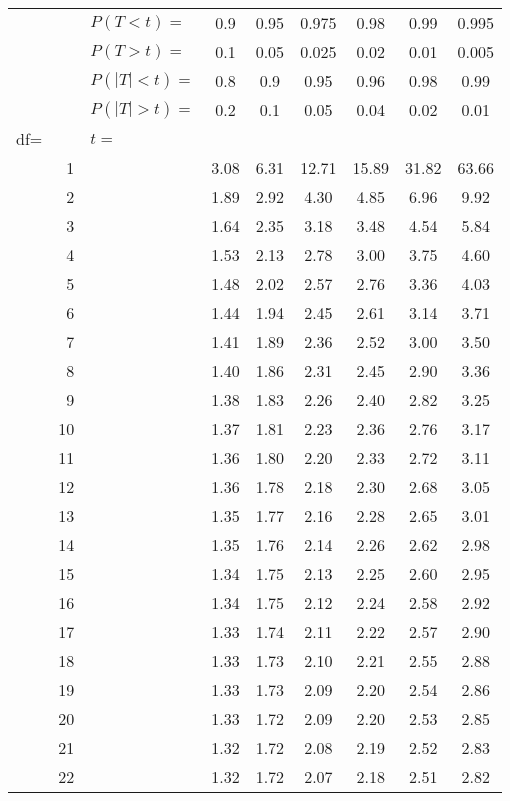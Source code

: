 \documentclass[12pt,letterpaper]{article}
\author{Chad Worley}
\begin{document}

\begin{center}
\renewcommand{\arraystretch}{1.0}
\begin{tabular}{|l r | l c c c c c c|}\hline
&& $P(T<t)=$ & 0.9 & 0.95 & 0.975 & 0.98 & 0.99 & 0.995\\
&& $P(T>t)=$ & 0.1 & 0.05 & 0.025 & 0.02 & 0.01 & 0.005\\
&& $P(|T|<t)=$ & 0.8 & 0.9 & 0.95 & 0.96 & 0.98 & 0.99\\
&& $P(|T|>t)=$ & 0.2 & 0.1 & 0.05 & 0.04 & 0.02 & 0.01\\\hline
df= && $t=$ & & & & & &\\ 
&1&& 3.08 & 6.31 & 12.71 & 15.89 & 31.82 & 63.66\\ 
&2&& 1.89 & 2.92 & 4.30 & 4.85 & 6.96 & 9.92\\ 
&3&& 1.64 & 2.35 & 3.18 & 3.48 & 4.54 & 5.84\\ 
&4&& 1.53 & 2.13 & 2.78 & 3.00 & 3.75 & 4.60\\ 
&5&& 1.48 & 2.02 & 2.57 & 2.76 & 3.36 & 4.03\\ 
&6&& 1.44 & 1.94 & 2.45 & 2.61 & 3.14 & 3.71\\ 
&7&& 1.41 & 1.89 & 2.36 & 2.52 & 3.00 & 3.50\\ 
&8&& 1.40 & 1.86 & 2.31 & 2.45 & 2.90 & 3.36\\ 
&9&& 1.38 & 1.83 & 2.26 & 2.40 & 2.82 & 3.25\\ 
&10&& 1.37 & 1.81 & 2.23 & 2.36 & 2.76 & 3.17\\ 
&11&& 1.36 & 1.80 & 2.20 & 2.33 & 2.72 & 3.11\\ 
&12&& 1.36 & 1.78 & 2.18 & 2.30 & 2.68 & 3.05\\ 
&13&& 1.35 & 1.77 & 2.16 & 2.28 & 2.65 & 3.01\\ 
&14&& 1.35 & 1.76 & 2.14 & 2.26 & 2.62 & 2.98\\ 
&15&& 1.34 & 1.75 & 2.13 & 2.25 & 2.60 & 2.95\\ 
&16&& 1.34 & 1.75 & 2.12 & 2.24 & 2.58 & 2.92\\ 
&17&& 1.33 & 1.74 & 2.11 & 2.22 & 2.57 & 2.90\\ 
&18&& 1.33 & 1.73 & 2.10 & 2.21 & 2.55 & 2.88\\ 
&19&& 1.33 & 1.73 & 2.09 & 2.20 & 2.54 & 2.86\\ 
&20&& 1.33 & 1.72 & 2.09 & 2.20 & 2.53 & 2.85\\ 
&21&& 1.32 & 1.72 & 2.08 & 2.19 & 2.52 & 2.83\\ 
&22&& 1.32 & 1.72 & 2.07 & 2.18 & 2.51 & 2.82\\ 

\end{tabular}
\end{center}
\end{document}
